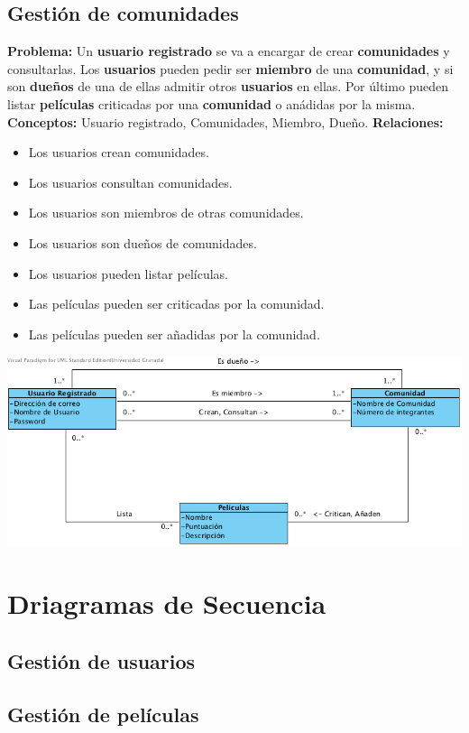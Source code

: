 \documentclass{article}
\begin{document}
	\subsection*{Gestión de comunidades}
	\textbf{Problema:} Un \textbf{usuario registrado} se va a encargar de crear \textbf{comunidades} y consultarlas. Los \textbf{usuarios} pueden pedir ser \textbf{miembro} de una \textbf{comunidad}, y si son \textbf{dueños} de una de ellas admitir otros \textbf{usuarios} en ellas. Por último pueden listar \textbf{películas} criticadas por una \textbf{comunidad} o anádidas por la misma.\\
	\textbf{Conceptos:} Usuario registrado, Comunidades, Miembro, Dueño.
	\textbf{Relaciones:}
		\begin{itemize}
			\item Los usuarios crean comunidades.
			\item Los usuarios consultan comunidades.
			\item Los usuarios son miembros de otras comunidades.
			\item Los usuarios son dueños de comunidades.
			\item Los usuarios pueden listar películas.
			\item Las películas pueden ser criticadas por la comunidad.
			\item Las películas pueden ser añadidas por la comunidad.
		\end{itemize}
		\includegraphics[width=1\linewidth]{./C-Comunidades}
		
\section{Driagramas de Secuencia}
	\subsection*{Gestión de usuarios}
	\subsection*{Gestión de películas}
\end{document}
